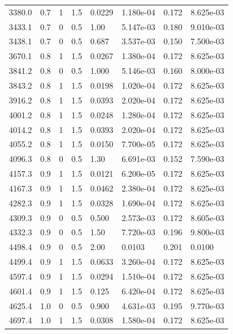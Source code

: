\documentclass[preview]{standalone}
\begin{document}
{{\begin{tabular}{L{1.2cm}C{1.2cm} C{0.3cm}C{0.5cm} C{1.4cm}C{1.4cm} C{1.4cm}C{1.4cm}}
  3380.0  &   0.7  & 1     & 1.5 &  0.0229  & 1.180e-04  & 0.172 &  8.625e-03   \\ 
  3433.1  &   0.7  & 0     & 0.5 &  1.00  & 5.147e-03  & 0.180 &  9.010e-03   \\ 
  3438.1  &   0.7  & 0     & 0.5 &  0.687  & 3.537e-03  & 0.150 &  7.500e-03   \\ 
  3670.1  &   0.8  & 1     & 1.5 &  0.0267  & 1.380e-04  & 0.172 &  8.625e-03   \\ 
  3841.2  &   0.8  & 0     & 0.5 &  1.000  & 5.146e-03  & 0.160 &  8.000e-03   \\ 
  3843.2  &   0.8  & 1     & 1.5 &  0.0198  & 1.020e-04  & 0.172 &  8.625e-03   \\ 
  3916.2  &   0.8  & 1     & 1.5 &  0.0393  & 2.020e-04  & 0.172 &  8.625e-03   \\ 
  4001.2  &   0.8  & 1     & 1.5 &  0.0248  & 1.280e-04  & 0.172 &  8.625e-03   \\ 
  4014.2  &   0.8  & 1     & 1.5 &  0.0393  & 2.020e-04  & 0.172 &  8.625e-03   \\ 
  4055.2  &   0.8  & 1     & 1.5 &  0.0150  & 7.700e-05  & 0.172 &  8.625e-03   \\ 
  4096.3  &   0.8  & 0     & 0.5 &  1.30  & 6.691e-03  & 0.152 &  7.590e-03   \\ 
  4157.3  &   0.9  & 1     & 1.5 &  0.0121  & 6.200e-05  & 0.172 &  8.625e-03   \\ 
  4167.3  &   0.9  & 1     & 1.5 &  0.0462  & 2.380e-04  & 0.172 &  8.625e-03   \\ 
  4282.3  &   0.9  & 1     & 1.5 &  0.0328  & 1.690e-04  & 0.172 &  8.625e-03   \\ 
  4309.3  &   0.9  & 0     & 0.5 &  0.500  & 2.573e-03  & 0.172 &  8.605e-03   \\ 
  4332.3  &   0.9  & 0     & 0.5 &  1.50  & 7.720e-03  & 0.196 &  9.800e-03   \\ 
  4498.4  &   0.9  & 0     & 0.5 &  2.00  & 0.0103  & 0.201 &  0.0100   \\ 
  4499.4  &   0.9  & 1     & 1.5 &  0.0633  & 3.260e-04  & 0.172 &  8.625e-03   \\ 
  4597.4  &   0.9  & 1     & 1.5 &  0.0294  & 1.510e-04  & 0.172 &  8.625e-03   \\ 
  4601.4  &   0.9  & 1     & 1.5 &  0.125  & 6.420e-04  & 0.172 &  8.625e-03   \\ 
  4625.4  &   1.0  & 0     & 0.5 &  0.900  & 4.631e-03  & 0.195 &  9.770e-03   \\ 
  4697.4  &   1.0  & 1     & 1.5 &  0.0308  & 1.580e-04  & 0.172 &  8.625e-03   \\ 

\end{tabular}}}
\end{document}
